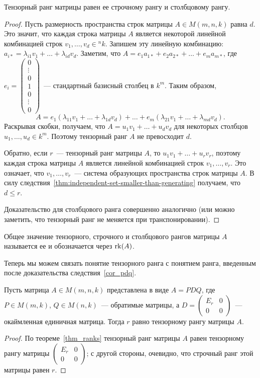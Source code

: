 \begin{theorem}\label{thm_ranks}
Тензорный ранг матрицы равен ее строчному рангу и столбцовому рангу.
\end{theorem}
\begin{proof}
Пусть размерность пространства строк матрицы $A\in M(m,n,k)$ равна
$d$. Это значит, что каждая строка матрицы $A$ является некоторой
линейной комбинацией строк $v_1,\dots,v_d\in {}^nk$.
Запишем эту линейную комбинацию:
$a_{i*} = \lambda_{i1}v_1+\dots+\lambda_{id}v_d$.
Заметим, что $A=e_1a_{1*}+e_2a_{2*}+\dots+e_ma_{m*}$, где
$e_i=\begin{pmatrix}0\\\vdots\\0\\1\\0\\\vdots\\0\end{pmatrix}$~---
стандартный базисный столбец в $k^m$.
Таким образом,
$$
A=e_1(\lambda_{11}v_1+\dots+\lambda_{1d}v_d) + \dots +
e_m(\lambda_{21}v_1+\dots+\lambda_{md}v_d).
$$
Раскрывая скобки, получаем, что $A=u_1v_1+\dots+u_dv_d$ для некоторых
столбцов $u_1,\dots,u_d\in k^m$.
Поэтому тензорный ранг $A$ не превосходит $d$.

Обратно, если $r$~--- тензорный ранг матрицы $A$, то
$u_1v_1+\dots+u_rv_r$, поэтому каждая строка матрицы $A$ является
линейной комбинацией строк $v_1,\dots,v_r$. Это означает, что
$v_1,\dots,v_r$~--- система образующих пространства строк матрицы
$A$. В силу следствия~\ref{thm:independent-set-smaller-than-generating}
получаем, что $d\leq r$.

Доказательство для столбцового ранга совершенно аналогично (или можно
заметить, что тензорный ранг не меняется при транспонировании).
\end{proof}

\begin{definition}
Общее значение тензорного, строчного и столбцового рангов матрицы $A$
называется ее  и обозначается через $\operatorname{rk}(A)$.
\end{definition}

Теперь мы можем связать понятие тензорного ранга с понятием ранга,
введенным после доказательства следствия~\ref{cor_pdq}.
\begin{corollary}\label{cor_pdq_and_rank}
Пусть матрица $A\in M(m,n,k)$ представлена в виде $A=PDQ$, где $P\in
M(m,k)$, $Q\in M(n,k)$~--- обратимые матрицы, а
$D=\begin{pmatrix}E_r&0\\0&0\end{pmatrix}$~--- окаймленная единичная
матрица. Тогда $r$ равно тензорному рангу матрицы $A$.
\end{corollary}
\begin{proof}
По теореме~\ref{thm_ranks} тензорный ранг матрицы $A$ равен тензорному
рангу матрицы $\begin{pmatrix}E_r&0\\0&0\end{pmatrix}$; с другой
стороны, очевидно, что строчный ранг этой матрицы равен $r$.
\end{proof}

